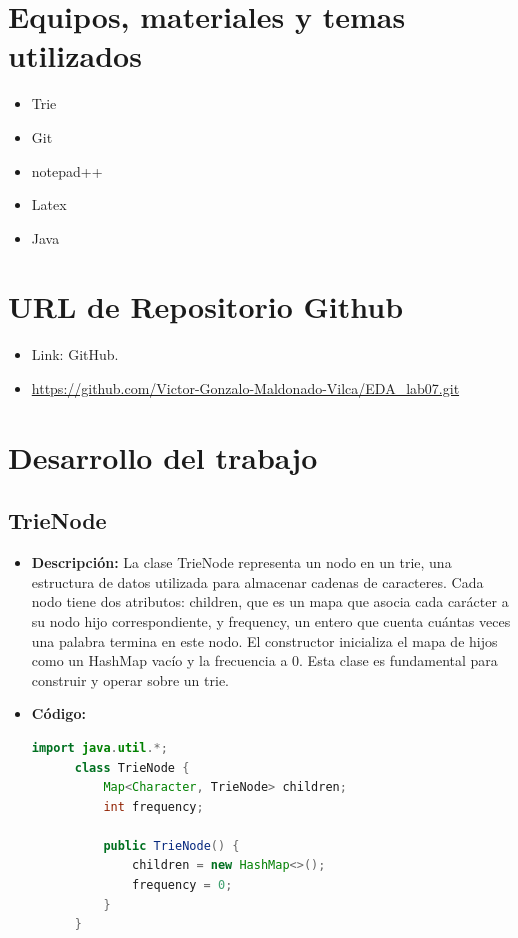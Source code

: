 \documentclass{article}
\begin{document}
		
	\section{Equipos, materiales y temas utilizados}
  \begin{itemize}
    \item Trie
    \item Git
    \item notepad++
    \item Latex
    \item Java
  \end{itemize}
  

  \section{URL de Repositorio Github}
  \begin{itemize}
    \item Link: GitHub.
    \item \url{https://github.com/Victor-Gonzalo-Maldonado-Vilca/EDA_lab07.git}
  \end{itemize}


  \section{Desarrollo del trabajo}
  

  \subsection{TrieNode}
  \begin{itemize}
    \item \textbf{Descripción: }La clase TrieNode representa un nodo en un trie, una estructura de datos utilizada para almacenar 
    cadenas de caracteres. Cada nodo tiene dos atributos: children, que es un mapa que asocia cada carácter a su nodo hijo 
    correspondiente, y frequency, un entero que cuenta cuántas veces una palabra termina en este nodo. El constructor inicializa 
    el mapa de hijos como un HashMap vacío y la frecuencia a 0. Esta clase es fundamental para construir y operar sobre un trie.
    \item \textbf{Código: }
    \begin{lstlisting}[language=Java, caption={Clase TrieNode}]
      import java.util.*;
      class TrieNode {
          Map<Character, TrieNode> children;
          int frequency;

          public TrieNode() {
              children = new HashMap<>();
              frequency = 0;
          }
      }
    \end{lstlisting}
  \end{itemize}
  
\end{document}
